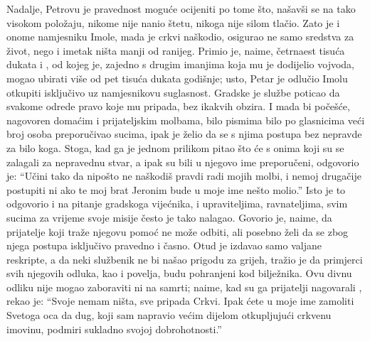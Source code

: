 \documentclass[a5paper,twoside]{article}
\begin{document}
\pend
\pstart
Nadalje, Petrovu je pravednost moguće ocijeniti po tome što, našavši se na tako visokom položaju, nikome nije nanio štetu, nikoga nije silom tlačio.  Zato je i onome namjesniku Imole, mada je crkvi naškodio, osigurao ne samo sredstva za život, nego i imetak ništa manji od ranijeg.  Primio je, naime, četrnaest tisuća dukata i , od kojeg je, zajedno s drugim imanjima koja mu je dodijelio vojvoda, mogao ubirati više od pet tisuća dukata godišnje; usto, Petar je odlučio Imolu otkupiti isključivo uz namjesnikovu suglasnost.  Gradske je službe poticao da svakome odrede pravo koje mu pripada, bez ikakvih obzira.  I mada bi počešće, nagovoren domaćim i prijateljskim molbama, bilo pismima bilo po glasnicima veći broj osoba preporučivao sucima, ipak je želio da se s njima postupa bez nepravde za bilo koga.  Stoga, kad ga je  jednom prilikom pitao što će s onima koji su se zalagali za nepravednu stvar, a ipak su bili u njegovo ime preporučeni, odgovorio je: ``Učini tako da nipošto ne naškodiš pravdi radi mojih molbi, i nemoj drugačije postupiti ni ako te moj brat Jeronim bude u moje ime nešto molio.''  Isto je to odgovorio i na pitanje gradskoga vijećnika, i upraviteljima, ravnateljima, svim sucima za vrijeme svoje misije često je tako nalagao.  Govorio je, naime, da prijatelje koji traže njegovu pomoć ne može odbiti, ali posebno želi da se zbog njega postupa isključivo pravedno i časno.  Otud je izdavao samo valjane reskripte, a da neki službenik ne bi našao prigodu za grijeh, tražio je da primjerci svih njegovih odluka, kao i povelja, budu pohranjeni kod bilježnika.  Ovu divnu odliku nije mogao zaboraviti ni na samrti; naime, kad su ga prijatelji nagovarali , rekao je: ``Svoje nemam ništa, sve pripada Crkvi.  Ipak ćete u moje ime zamoliti Svetoga oca da dug, koji sam napravio većim dijelom otkupljujući crkvenu imovinu, podmiri sukladno svojoj dobrohotnosti.''
\end{document}
